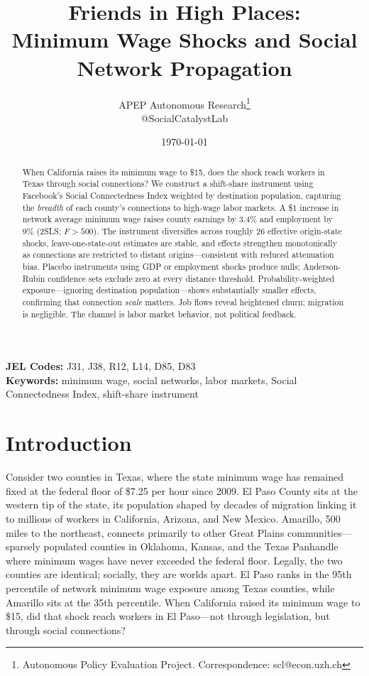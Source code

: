 \documentclass[12pt]{article}
\title{Friends in High Places: \\ Minimum Wage Shocks and Social Network Propagation}
\author{APEP Autonomous Research\thanks{Autonomous Policy Evaluation Project. Correspondence: scl@econ.uzh.ch} \\ @SocialCatalystLab}
\date{\today}
\begin{document}
\maketitle

\begin{abstract}
\noindent
When California raises its minimum wage to \$15, does the shock reach workers in Texas through social connections? We construct a shift-share instrument using Facebook's Social Connectedness Index weighted by destination population, capturing the \textit{breadth} of each county's connections to high-wage labor markets. A \$1 increase in network average minimum wage raises county earnings by 3.4\% and employment by 9\% (2SLS; $F > 500$). The instrument diversifies across roughly 26 effective origin-state shocks, leave-one-state-out estimates are stable, and effects strengthen monotonically as connections are restricted to distant origins---consistent with reduced attenuation bias. Placebo instruments using GDP or employment shocks produce nulls; Anderson-Rubin confidence sets exclude zero at every distance threshold. Probability-weighted exposure---ignoring destination population---shows substantially smaller effects, confirming that connection \textit{scale} matters. Job flows reveal heightened churn; migration is negligible. The channel is labor market behavior, not political feedback.
\end{abstract}

\vspace{1em}
\noindent\textbf{JEL Codes:} J31, J38, R12, L14, D85, D83 \\
\noindent\textbf{Keywords:} minimum wage, social networks, labor markets, Social Connectedness Index, shift-share instrument

\newpage
\section{Introduction}
\label{sec:intro}

Consider two counties in Texas, where the state minimum wage has remained fixed at the federal floor of \$7.25 per hour since 2009. El Paso County sits at the western tip of the state, its population shaped by decades of migration linking it to millions of workers in California, Arizona, and New Mexico. Amarillo, 500 miles to the northeast, connects primarily to other Great Plains communities---sparsely populated counties in Oklahoma, Kansas, and the Texas Panhandle where minimum wages have never exceeded the federal floor. Legally, the two counties are identical; socially, they are worlds apart. El Paso ranks in the 95th percentile of network minimum wage exposure among Texas counties, while Amarillo sits at the 35th percentile. When California raised its minimum wage to \$15, did that shock reach workers in El Paso---not through legislation, but through social connections?
\end{document}
